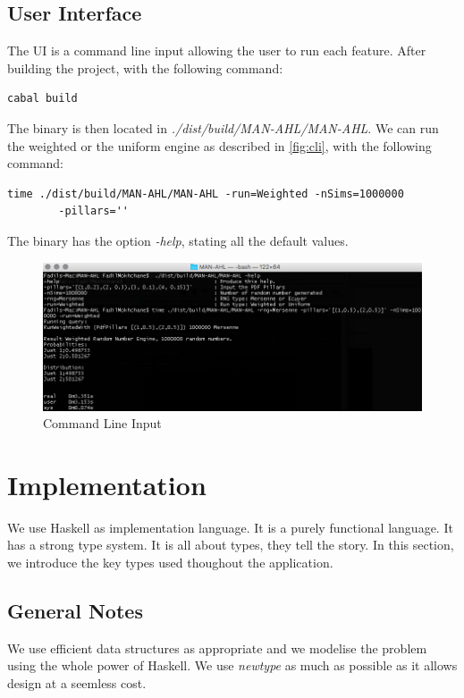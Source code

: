 \documentclass[12pt,a4paper,article]{memoir} %
\begin{document}
\subsection{User Interface}
The UI is a command line input allowing the user to run each feature.
After building the project, with the following command:
\begin{verbatim}
cabal build
\end{verbatim}
The binary is then located in \emph{./dist/build/MAN-AHL/MAN-AHL}.
We can run the weighted or the uniform engine
 as described in \autoref{fig:cli}, with the following command:
\begin{verbatim}
time ./dist/build/MAN-AHL/MAN-AHL -run=Weighted -nSims=1000000
        -pillars=''
\end{verbatim}
 The binary has the option \emph{-help}, stating all the default values.
\begin{figure}[h!]
\begin{center}
\includegraphics[width=1\textwidth]{img/cli.png}
\caption{Command Line Input}
\label{fig:cli}
\end{center}
\end{figure}

\section{Implementation}

We use Haskell as implementation language. It is a purely functional language.
It has a strong type system. It is all about types, they tell the story.
In this section, we introduce the key types used thoughout the application.

\subsection{General Notes}
We use efficient data structures as appropriate and we modelise the problem using
the whole power of Haskell. 
We use \emph{newtype} as much as possible as it allows design at a 
seemless cost.
\end{document}
